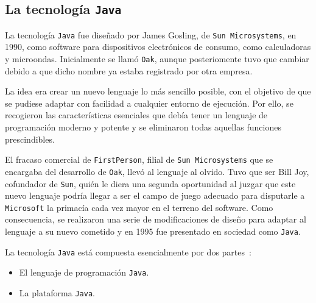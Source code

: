 
  \subsection{La tecnología \texttt{Java}}
  \label{subsec:java}
La tecnología \texttt{Java} fue diseñado por James Gosling, de \texttt{Sun 
Microsystems}, en 1990, como software para dispositivos electrónicos de
consumo, como calculadoras y microondas. Inicialmente se llamó \texttt{Oak},
aunque posteriomente tuvo que cambiar debido a que dicho nombre ya estaba
registrado por otra empresa.

La idea era crear un nuevo lenguaje lo más sencillo posible, con el objetivo
de que se pudiese adaptar con facilidad a cualquier entorno de ejecución. Por
ello, se recogieron las características esenciales que debía tener un lenguaje
de programación moderno y potente y se eliminaron todas aquellas funciones
prescindibles.

El fracaso comercial de \texttt{FirstPerson}, filial de \texttt{Sun
Microsystems} que se encargaba del desarrollo de \texttt{Oak}, llevó al
lenguaje al olvido. Tuvo que ser Bill Joy, cofundador de \texttt{Sun}, quién
le diera una segunda oportunidad al juzgar que este nuevo lenguaje podría
llegar a ser el campo de juego adecuado para disputarle a \texttt{Microsoft}
la primacía cada vez mayor en el terreno del software. Como consecuencia, se
realizaron una serie de modificaciones de diseño para adaptar al lenguaje
a su nuevo cometido y en 1995 fue presentado en sociedad como \texttt{Java}.

La tecnología \texttt{Java} está compuesta esencialmente por dos
partes~\cite{bib:java}:
\begin{itemize}
\item El lenguaje de programación \texttt{Java}.
\item La plataforma \texttt{Java}.
\end{itemize}

